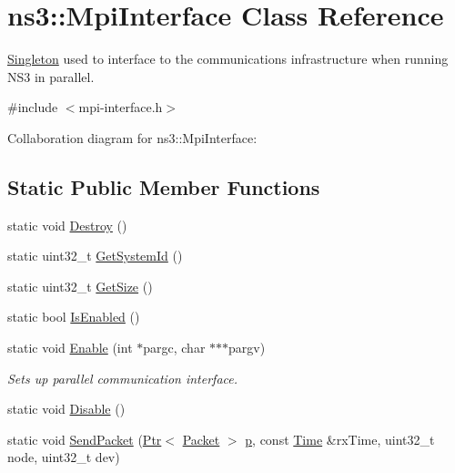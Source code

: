\hypertarget{classns3_1_1MpiInterface}{}\section{ns3\+:\+:Mpi\+Interface Class Reference}
\label{classns3_1_1MpiInterface}


\hyperlink{classns3_1_1Singleton}{Singleton} used to interface to the communications infrastructure when running N\+S3 in parallel.  




{\ttfamily \#include $<$mpi-\/interface.\+h$>$}



Collaboration diagram for ns3\+:\+:Mpi\+Interface\+:
\subsection*{Static Public Member Functions}
\begin{DoxyCompactItemize}
\item 
static void \hyperlink{classns3_1_1MpiInterface_a6cc83aa90c7e203219f8aa3889ae44f7}{Destroy} ()
\item 
static uint32\+\_\+t \hyperlink{classns3_1_1MpiInterface_a7f1f671b55948fb1c8f7eb54f22a9619}{Get\+System\+Id} ()
\item 
static uint32\+\_\+t \hyperlink{classns3_1_1MpiInterface_ab35c742e7e7ad3fa07cf0dbb92413c82}{Get\+Size} ()
\item 
static bool \hyperlink{classns3_1_1MpiInterface_a5964beea2f60d6110bed18b14012e583}{Is\+Enabled} ()
\item 
static void \hyperlink{classns3_1_1MpiInterface_ae4512e9386ba0c1cd0857b8ec4620a8b}{Enable} (int $\ast$pargc, char $\ast$$\ast$$\ast$pargv)
\begin{DoxyCompactList}\small\item\em Sets up parallel communication interface. \end{DoxyCompactList}\item 
static void \hyperlink{classns3_1_1MpiInterface_ab5c2688cd009d8eaebd49af26beaa04e}{Disable} ()
\item 
static void \hyperlink{classns3_1_1MpiInterface_a4e8c1510f211948683038e6ee12e692a}{Send\+Packet} (\hyperlink{classns3_1_1Ptr}{Ptr}$<$ \hyperlink{classns3_1_1Packet}{Packet} $>$ \hyperlink{lte__link__budget__x2__handover__measures_8m_ac9de518908a968428863f829398a4e62}{p}, const \hyperlink{classns3_1_1Time}{Time} \&rx\+Time, uint32\+\_\+t node, uint32\+\_\+t dev)
\end{DoxyCompactItemize}
